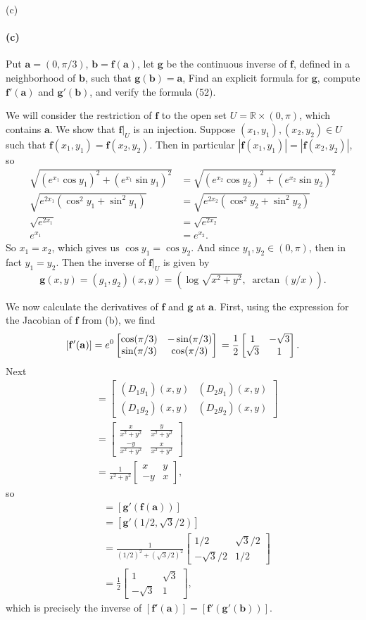 \documentclass[12pt]{article}
\newenvironment{fullbox}{\begin{lrbox}{\savefullbox}\begin{minipage}{\dimexpr\textwidth-2\fboxsep\relax}}{\end{minipage}\end{lrbox}\begin{center}\framebox[\textwidth]{\usebox{\savefullbox}}\end{center}}
\newenvironment{pbox}[1][]{\begin{fullbox}\ifx#1\empty\else\paragraph{#1}\fi}{\end{fullbox}}
\theoremstyle{definition}
\newcommand{\R}{\mathbb{R}}
\newcommand{\f}{\mathbf{f}}
\newcommand{\g}{\mathbf{g}}
\renewcommand{\aa}{\mathbf{a}}
\newcommand{\bb}{\mathbf{b}}
\newcommand{\mat}[1]{\begin{bmatrix}#1\end{bmatrix}}
\begin{document}
\newpage
\begin{pbox}[(c)]
    Put $\aa = (0, \pi/3)$, $\bb= \f(\aa)$, let $\g$ be the continuous inverse of $\f$, defined in a neighborhood of $\bb$, such that $\g(\bb) = \aa$, Find an explicit formula for $\g$, compute $\f'(\aa)$ and $\g'(\bb)$, and verify the formula (52).
\end{pbox}

We will consider the restriction of $\f$ to the open set $U = \R \times (0, \pi)$, which contains $\aa$. We show that $\f|_U$ is an injection. Suppose $(x_1, y_1), (x_2, y_2) \in U$ such that $\f(x_1, y_1) = \f(x_2, y_2)$. Then in particular $|\f(x_1, y_1)| = |\f(x_2, y_2)|$, so
\begin{align*}
    \sqrt{(e^{x_1}\cos y_1)^2 + (e^{x_1}\sin y_1)^2} &= \sqrt{(e^{x_2}\cos y_2)^2 + (e^{x_2}\sin y_2)^2} \\
    \sqrt{e^{2x_1}(\cos^2 y_1 + \sin^2 y_1)} &= \sqrt{e^{2x_2}(\cos^2 y_2 + \sin^2 y_2)} \\
    \sqrt{e^{2x_1}} &= \sqrt{e^{2x_2}} \\
    e^{x_1} &= e^{x_2}.
\end{align*}
So $x_1 = x_2$, which gives us $\cos y_1 = \cos y_2$. And since $y_1, y_2 \in (0, \pi)$, then in fact $y_1 = y_2$. Then the inverse of $\f|_U$ is given by
\[
    \g(x, y) = (g_1, g_2)(x, y) = \left(\log \sqrt{x^2 + y^2},\; \arctan(y/x)\right).
\]

We now calculate the derivatives of $\f$ and $\g$ at $\aa$. First, using the expression for the Jacobian of $\f$ from (b), we find
\[
    [\f'(\aa)] 
        = e^0 \mat{\cos(\pi/3) & -\sin(\pi/3) \\ \sin(\pi/3) & \cos(\pi/3)} \\
        = \frac{1}{2}\mat{1 & -\sqrt{3}\\ \sqrt{3} & 1}.
\]
Next
\begin{align*}
    [\g'(x, y)]
        &= \mat{(D_1g_1)(x, y) & (D_2g_1)(x, y) \\ (D_1g_2)(x, y) & (D_2g_2)(x, y)} \\
        &= \mat{\frac{x}{x^2 + y^2} & \frac{y}{x^2 + y^2} \\ \frac{-y}{x^2 + y^2} & \frac{x}{x^2 + y^2}} \\
        &= \frac{1}{x^2 + y^2}\mat{x & y\\ -y & x},
\end{align*}
so
\begin{align*}
    [\g'(\bb)]
        &= [\g'(\f(\aa))] \\
        &= [\g'(1/2, \sqrt{3}/2)] \\
        &= \frac{1}{(1/2)^2 + (\sqrt{3}/2)^2}\mat{1/2 & \sqrt{3}/2\\ -\sqrt{3}/2 & 1/2} \\
        &= \frac{1}{2}\mat{1 & \sqrt{3}\\ -\sqrt{3} & 1},
\end{align*}
which is precisely the inverse of $[\f'(\aa)] = [\f'(\g'(\bb))]$. 
\end{document}
